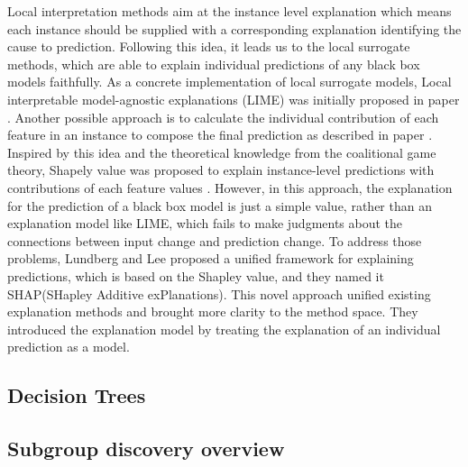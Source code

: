 Local interpretation methods aim at the instance level explanation which means each instance should be supplied with a corresponding explanation identifying the cause to prediction. Following this idea, it leads us to the local surrogate methods, which are able to explain individual predictions of any black box models faithfully. As a concrete implementation of local surrogate models, Local interpretable model-agnostic explanations (LIME) was initially proposed in paper \cite{ribeiro2016should}. Another possible approach is to calculate the individual contribution of each feature in an instance to compose the final prediction as described in paper \cite{robnik2008explaining}. Inspired by this idea and the theoretical knowledge from the coalitional game theory, Shapely value was proposed to explain instance-level predictions with contributions of each feature values \cite{kononenko2010efficient}. However, in this approach, the explanation for the prediction of a black box model is just a simple value, rather than an explanation model like LIME, which fails to make judgments about the connections between input change and prediction change. To address those problems, Lundberg and Lee \cite{lundberg2017unified} proposed a unified framework for explaining predictions, which is based on the Shapley value, and they named it SHAP(SHapley Additive exPlanations). This novel approach unified existing explanation methods and brought more clarity to the method space. They introduced the explanation model by treating the explanation of an individual prediction as a model.


\subsection{Decision Trees}


\subsection{Subgroup discovery overview}

